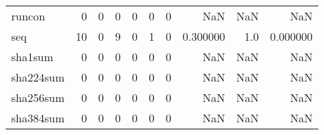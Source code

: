 \begin{longtable}{lrrrrrrrrr}
runcon    &                                       0 &                                                  0 &                                                  0 &                                                  0 &                                                  0 &                                                  0 &                                                NaN &                                    NaN &                                  NaN \\
seq       &                                      10 &                                                  0 &                                                  9 &                                                  0 &                                                  1 &                                                  0 &                                           0.300000 &                                    1.0 &                             0.000000 \\
sha1sum   &                                       0 &                                                  0 &                                                  0 &                                                  0 &                                                  0 &                                                  0 &                                                NaN &                                    NaN &                                  NaN \\
sha224sum &                                       0 &                                                  0 &                                                  0 &                                                  0 &                                                  0 &                                                  0 &                                                NaN &                                    NaN &                                  NaN \\
sha256sum &                                       0 &                                                  0 &                                                  0 &                                                  0 &                                                  0 &                                                  0 &                                                NaN &                                    NaN &                                  NaN \\
sha384sum &                                       0 &                                                  0 &                                                  0 &                                                  0 &                                                  0 &                                                  0 &                                                NaN &                                    NaN &                                  NaN \\

\end{longtable}
